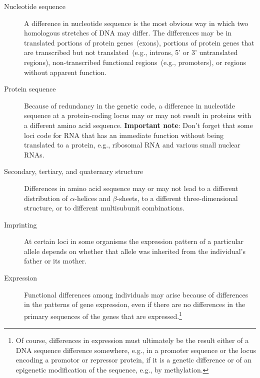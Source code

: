 \documentclass[12pt]{article}
\begin{document}
\begin{description}

\item[Nucleotide sequence] A difference in nucleotide sequence is the
  most obvious way in which two homologous stretches of DNA may
  differ. The differences may be in translated portions of protein
  genes~(exons), portions of protein genes that are transcribed but
  not translated~(e.g., introns, 5' or 3' untranslated regions),
  non-transcribed functional regions~(e.g., promoters), or regions
  without apparent function.

\item[Protein sequence] Because of redundancy in the genetic code, a
  difference in nucleotide sequence at a protein-coding locus may or
  may not result in proteins with a different amino acid
  sequence. {\bf Important note}: Don't forget that some loci code for
  RNA that has an immediate function without being translated to a
  protein, e.g., ribosomal RNA and various small nuclear RNAs.

\item[Secondary, tertiary, and quaternary structure] Differences in
  amino acid sequence may or may not lead to a different distribution
  of $\alpha$-helices and $\beta$-sheets, to a different
  three-dimensional structure, or to different multisubunit
  combinations.

\item[Imprinting] At certain loci in some organisms the expression
  pattern of a particular allele depends on whether that allele was
  inherited from the individual's father or its
  mother.

\item[Expression] Functional differences among individuals may arise
  because of differences in the patterns of gene expression, even if
  there are no differences in the primary sequences of the genes that
  are expressed.\footnote{Of course, differences in expression must
    ultimately be the result either of a DNA sequence difference
    somewhere, e.g., in a promoter sequence or the locus encoding a
    promotor or repressor protein, if it is a genetic difference or of
    an epigenetic modification of the sequence, e.g., by methylation.}


\end{description}
\end{document}
